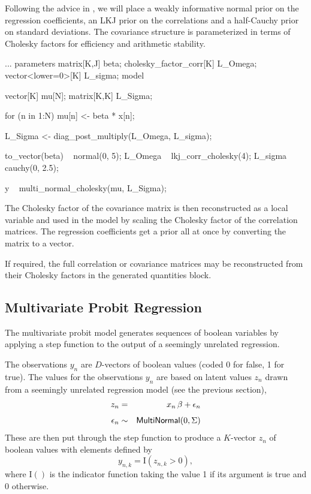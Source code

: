 Following the advice in ,
we will place a weakly informative normal prior on the regression
coefficients, an LKJ prior on the correlations and a half-Cauchy prior
on standard deviations.  The covariance structure is parameterized in
terms of Cholesky factors for efficiency and arithmetic stability.
%
\begin{stancode}
...
parameters {
  matrix[K,J] beta;
  cholesky_factor_corr[K] L_Omega;
  vector<lower=0>[K] L_sigma;
}
model {
  vector[K] mu[N];
  matrix[K,K] L_Sigma;

  for (n in 1:N)
    mu[n] <- beta * x[n];

  L_Sigma <- diag_post_multiply(L_Omega, L_sigma);

  to_vector(beta) ~ normal(0, 5);
  L_Omega ~ lkj_corr_cholesky(4);
  L_sigma ~ cauchy(0, 2.5);

  y ~ multi_normal_cholesky(mu, L_Sigma);
}
\end{stancode}
%
The Cholesky factor of the covariance matrix is then reconstructed as
a local variable and used in the model by scaling the Cholesky factor
of the correlation matrices. The regression coefficients get a prior
all at once by converting the matrix  to a vector.

If required, the full correlation or covariance matrices may be
reconstructed from their Cholesky factors in the generated quantities
block.  


\subsection{Multivariate Probit Regression}

The multivariate probit model generates sequences of boolean variables
by applying a step function to the output of a seemingly unrelated
regression.

The observations $y_n$ are $D$-vectors of boolean values (coded 0 for
false, 1 for true).  The values for the observations $y_n$ are based
on latent values $z_n$ drawn from a seemingly unrelated regression
model (see the previous section), 
%
\begin{eqnarray*}
 z_n & = & x_n \, \beta + \epsilon_n
\\[4pt]
 \epsilon_n & \sim & \distro{MultiNormal}(0, \Sigma)
\end{eqnarray*}
%
These are then put through the step function to produce a $K$-vector $z_n$
of boolean values with elements defined by
\[
y_{n,k} = \mathrm{I}(z_{n,k} > 0),
\]
where $\mathrm{I}()$ is the indicator function taking the value 1 if its
argument is true and 0 otherwise.

